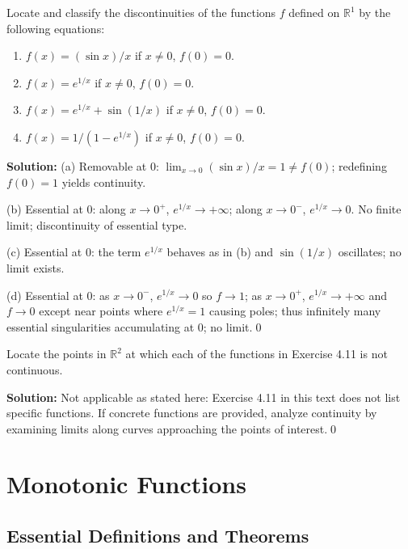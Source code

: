\begin{problembox}
Locate and classify the discontinuities of the functions $f$ defined on $\mathbb{R}^1$ by the following equations:
\begin{enumerate}[label=(\alph*)]
\item $f(x) = (\sin x)/x$ if $x \neq 0$, $f(0) = 0$.
\item $f(x) = e^{1/x}$ if $x \neq 0$, $f(0) = 0$.
\item $f(x) = e^{1/x} + \sin(1/x)$ if $x \neq 0$, $f(0) = 0$.
\item $f(x) = 1/(1 - e^{1/x})$ if $x \neq 0$, $f(0) = 0$.
\end{enumerate}
\end{problembox}

\noindent\textbf{Solution:}
(a) Removable at $0$: $\lim_{x\to0}(\sin x)/x=1\ne f(0)$; redefining $f(0)=1$ yields continuity.

(b) Essential at $0$: along $x\to 0^+$, $e^{1/x}\to+\infty$; along $x\to0^-$, $e^{1/x}\to 0$. No finite limit; discontinuity of essential type.

(c) Essential at $0$: the term $e^{1/x}$ behaves as in (b) and $\sin(1/x)$ oscillates; no limit exists.

(d) Essential at $0$: as $x\to0^-$, $e^{1/x}\to0$ so $f\to 1$; as $x\to0^+$, $e^{1/x}\to+\infty$ and $f\to 0$ except near points where $e^{1/x}=1$ causing poles; thus infinitely many essential singularities accumulating at $0$; no limit.\qed



\begin{problembox}
Locate the points in $\mathbb{R}^2$ at which each of the functions in Exercise 4.11 is not continuous.
\end{problembox}

\noindent\textbf{Solution:}
Not applicable as stated here: Exercise 4.11 in this text does not list specific functions. If concrete functions are provided, analyze continuity by examining limits along curves approaching the points of interest.\qed

\section{Monotonic Functions}

\subsection*{Essential Definitions and Theorems}

